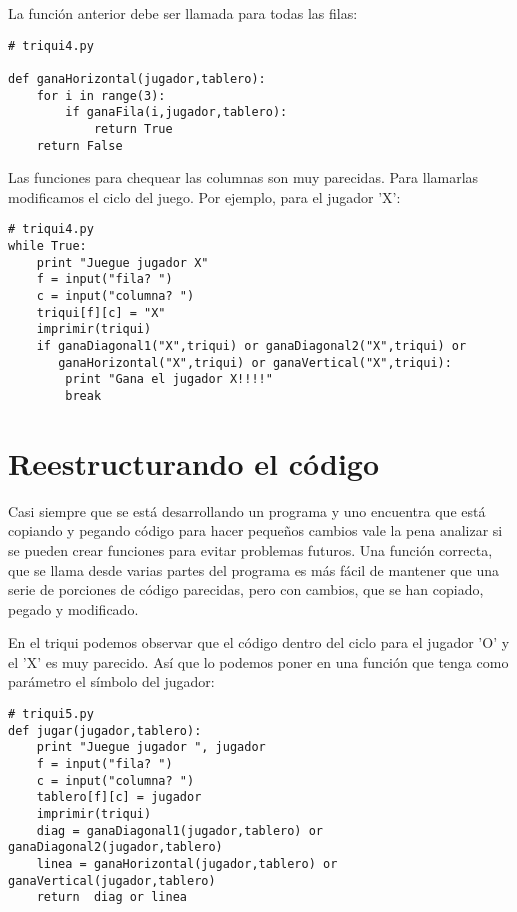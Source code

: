 La función anterior debe ser llamada para todas las filas:

\beforeverb
\begin{verbatim}
# triqui4.py

def ganaHorizontal(jugador,tablero):
    for i in range(3):
        if ganaFila(i,jugador,tablero):
            return True
    return False
\end{verbatim}
\afterverb

Las funciones para chequear las columnas son muy parecidas. Para llamarlas  
modificamos el ciclo del juego. Por ejemplo, para el jugador 'X':

\beforeverb
\begin{verbatim}
# triqui4.py
while True:
    print "Juegue jugador X"
    f = input("fila? ")
    c = input("columna? ")
    triqui[f][c] = "X"
    imprimir(triqui)
    if ganaDiagonal1("X",triqui) or ganaDiagonal2("X",triqui) or 
       ganaHorizontal("X",triqui) or ganaVertical("X",triqui):
        print "Gana el jugador X!!!!"
        break
\end{verbatim}
\afterverb

\section{Reestructurando el código}

Casi siempre que se está desarrollando un programa y uno encuentra que está copiando y
pegando código para hacer pequeños cambios vale la pena analizar si se pueden crear
funciones para evitar problemas futuros. Una función correcta, que se llama desde
varias partes del programa es más fácil de mantener que una serie de porciones de 
código parecidas, pero con cambios, que se han copiado, pegado y modificado.

En el triqui podemos observar que el código dentro del ciclo para el jugador 'O' 
y el 'X' es muy parecido. Así que  lo podemos poner en una
función que tenga como parámetro el símbolo del jugador:

\beforeverb
\begin{verbatim}
# triqui5.py
def jugar(jugador,tablero):
    print "Juegue jugador ", jugador
    f = input("fila? ")
    c = input("columna? ")
    tablero[f][c] = jugador
    imprimir(triqui)
    diag = ganaDiagonal1(jugador,tablero) or ganaDiagonal2(jugador,tablero)
    linea = ganaHorizontal(jugador,tablero) or ganaVertical(jugador,tablero)
    return  diag or linea
\end{verbatim}
\afterverb

